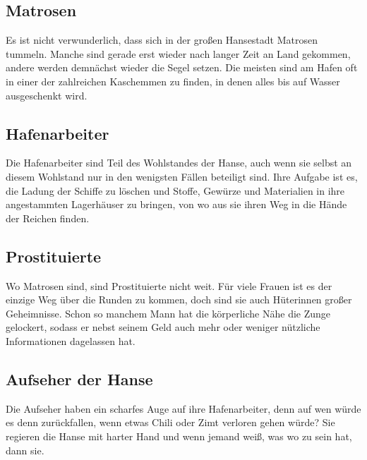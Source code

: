 \subsection{Matrosen}

Es ist nicht verwunderlich, dass sich in der großen Hansestadt Matrosen tummeln. Manche sind gerade erst wieder nach langer Zeit an Land gekommen, andere werden demnächst wieder die Segel setzen. Die meisten sind am Hafen oft in einer der zahlreichen Kaschemmen zu finden, in denen alles bis auf Wasser ausgeschenkt wird.

\subsection{Hafenarbeiter}

Die Hafenarbeiter sind Teil des Wohlstandes der Hanse, auch wenn sie selbst an diesem Wohlstand nur in den wenigsten Fällen beteiligt sind. Ihre Aufgabe ist es, die Ladung der Schiffe zu löschen und Stoffe, Gewürze und Materialien in ihre angestammten Lagerhäuser zu bringen, von wo aus sie ihren Weg in die Hände der Reichen finden.


\subsection{Prostituierte}

Wo Matrosen sind, sind Prostituierte nicht weit. Für viele Frauen ist es der einzige Weg über die Runden zu kommen, doch sind sie auch Hüterinnen großer Geheimnisse. Schon so manchem Mann hat die körperliche Nähe die Zunge gelockert, sodass er nebst seinem Geld auch mehr oder weniger nützliche Informationen dagelassen hat.


\subsection{Aufseher der Hanse}

Die Aufseher haben ein scharfes Auge auf ihre Hafenarbeiter, denn auf wen würde es denn zurückfallen, wenn etwas Chili oder Zimt verloren gehen würde? Sie regieren die Hanse mit harter Hand und wenn jemand weiß, was wo zu sein hat, dann sie.

